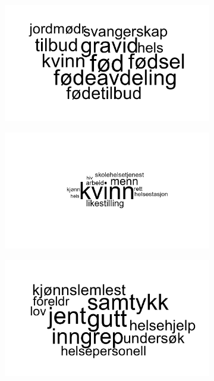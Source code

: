 \documentclass[12pt]{article}
\begin{document}
	\begin{figure}[h]
		\centering
		\begin{subfigure}{0.3\linewidth}
		\includegraphics[scale=0.40]{topic119wordcloud.png}
		\end{subfigure}
	\begin{subfigure}{0.3\linewidth}
		\includegraphics[scale=0.40]{topic135wordcloud.png}
		\end{subfigure}
	\begin{subfigure}{0.3\linewidth}
		\includegraphics[scale=0.40]{topic138wordcloud.png}
	\end{subfigure}
	\end{figure}
	
\end{document}
